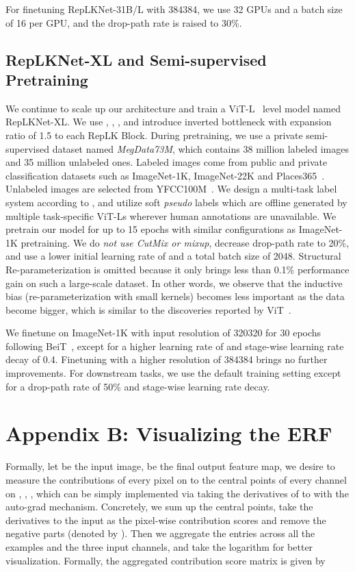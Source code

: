 \documentclass[10pt,twocolumn,letterpaper]{article}
\begin{document}
	For finetuning RepLKNet-31B/L with 384384, we use 32 GPUs and a batch size of 16 per GPU, and the drop-path rate is raised to 30\%.
	
	
	\subsection*{RepLKNet-XL and Semi-supervised Pretraining}
	
	We continue to scale up our architecture and train a ViT-L~\cite{vit} level model named RepLKNet-XL. We use , , , and introduce inverted bottleneck with expansion ratio of 1.5 to each RepLK Block.
	During pretraining, we use a private semi-supervised dataset named \emph{MegData73M}, which contains 38 million labeled images and 35 million unlabeled ones. Labeled images come from public and private classification datasets such as ImageNet-1K, ImageNet-22K and Places365~\cite{zhou2017places}. Unlabeled images are selected from YFCC100M~\cite{thomee2016yfcc100m}. We design a multi-task label system according to \cite{ghiasi2021multi}, and utilize soft \textit{pseudo} labels which are offline generated by multiple task-specific ViT-Ls wherever human annotations are unavailable. We pretrain our model for up to 15 epochs with similar configurations as ImageNet-1K pretraining. We do \emph{not use CutMix or mixup}, decrease drop-path rate to 20\%, and use a lower initial learning rate of  and a total batch size of 2048. Structural Re-parameterization is omitted because it only brings less than 0.1\% performance gain on such a large-scale dataset. In other words, we observe that the inductive bias (re-parameterization with small kernels) becomes less important as the data become bigger, which is similar to the discoveries reported by ViT~\cite{vit}.
	
	We finetune on ImageNet-1K with input resolution of 320320 for 30 epochs following BeiT~\cite{bao2021beit}, except for a higher learning rate of  and stage-wise learning rate decay of 0.4. Finetuning with a higher resolution of 384384 brings no further improvements. For downstream tasks, we use the default training setting except for a drop-path rate of 50\% and stage-wise learning rate decay.
	
	\section*{Appendix B: Visualizing the ERF}
	
	Formally, let  be the input image,  be the final output feature map, we desire to measure the contributions of every pixel on  to the central points of every channel on , \ie, , which can be simply implemented via taking the derivatives of  to  with the auto-grad mechanism. Concretely, we sum up the central points, take the derivatives to the input as the pixel-wise contribution scores and remove the negative parts (denoted by ). Then we aggregate the entries across all the examples and the three input channels, and take the logarithm for better visualization. Formally, the aggregated contribution score matrix  is given by
	
\end{document}
